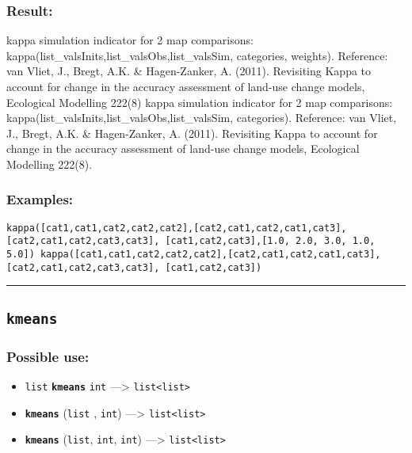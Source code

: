 \documentclass[]{book}
\providecommand{\tightlist}{%
  \setlength{\itemsep}{0pt}\setlength{\parskip}{0pt}}
\theoremstyle{definition}
\theoremstyle{definition}
\theoremstyle{definition}
\theoremstyle{remark}
\begin{document}
\subsubsection{Result:}\label{result-302}

kappa simulation indicator for 2 map comparisons:
kappa(list\_valsInits,list\_valsObs,list\_valsSim, categories, weights).
Reference: van Vliet, J., Bregt, A.K. \& Hagen-Zanker, A. (2011).
Revisiting Kappa to account for change in the accuracy assessment of
land-use change models, Ecological Modelling 222(8) kappa simulation
indicator for 2 map comparisons:
kappa(list\_valsInits,list\_valsObs,list\_valsSim, categories).
Reference: van Vliet, J., Bregt, A.K. \& Hagen-Zanker, A. (2011).
Revisiting Kappa to account for change in the accuracy assessment of
land-use change models, Ecological Modelling 222(8).

\subsubsection{Examples:}\label{examples-219}

\begin{verbatim}
kappa([cat1,cat1,cat2,cat2,cat2],[cat2,cat1,cat2,cat1,cat3],[cat2,cat1,cat2,cat3,cat3], [cat1,cat2,cat3],[1.0, 2.0, 3.0, 1.0, 5.0]) kappa([cat1,cat1,cat2,cat2,cat2],[cat2,cat1,cat2,cat1,cat3],[cat2,cat1,cat2,cat3,cat3], [cat1,cat2,cat3]) 
\end{verbatim}

\begin{center}\rule{0.5\linewidth}{\linethickness}\end{center}

\subsection{\texorpdfstring{\texttt{kmeans}}{kmeans}}\label{kmeans}

\subsubsection{Possible use:}\label{possible-use-313}

\begin{itemize}
\tightlist
\item
  \texttt{list} \textbf{\texttt{kmeans}} \texttt{int} ---\textgreater{}
  \texttt{list\textless{}list\textgreater{}}
\item
  \textbf{\texttt{kmeans}} (\texttt{list} , \texttt{int})
  ---\textgreater{} \texttt{list\textless{}list\textgreater{}}
\item
  \textbf{\texttt{kmeans}} (\texttt{list}, \texttt{int}, \texttt{int})
  ---\textgreater{} \texttt{list\textless{}list\textgreater{}}
\end{itemize}
\end{document}
